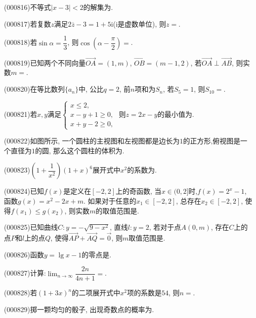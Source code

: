 \item (000816)不等式$|x-3|<2$的解集为.
\item (000817)若复数$z$满足$2 \overline z-3=1+5 \mathrm{i}$($\mathrm{i}$是虚数单位), 则$z=$.
\item (000818)若$\sin\alpha =\dfrac13$, 则$\cos(\alpha -\dfrac{\pi}2)=$.
\item (000819)已知两个不同向量$\overrightarrow{OA}=(1,m)$, $\overrightarrow{OB}=(m-1,2)$, 若$\overrightarrow{OA}\perp \overrightarrow{AB}$, 则实数$m=$.
\item (000820)在等比数列$\{a_n\}$中, 公比$q=2$, 前$n$项和为$S_n$, 若$S_5=1$, 则$S_{10}=$.
\item (000821)若$x,y$满足$\begin{cases}x\le 2, \\ x-y+1\ge 0, \\ x+y-2\ge 0,\end{cases}$ 则$z=2x-y$的最小值为.
\item (000822)如图所示, 一个圆柱的主视图和左视图都是边长为$1$的正方形,俯视图是一个直径为$1$的圆, 那么这个圆柱的体积为.
\begin{center}
\end{center}
\item (000823)$(1+\dfrac1{x^2})(1+x)^6$展开式中$x^2$的系数为.
\item (000824)已知$f(x)$是定义在$[-2,2]$上的奇函数, 当$x\in (0,2]$时,$f(x)=2^x-1$, 函数$g(x)=x^2-2x+m$. 如果对于任意的$x_1\in [-2,2]$, 总存在$x_2\in [-2,2]$, 使得$f(x_1)\le g(x_2)$, 则实数$m$的取值范围是.
\item (000825)已知曲线$C:y=-\sqrt{9-x^2}$, 直线$l:y=2$, 若对于点$A(0,m)$, 存在$C$上的点$P$和$l$上的点$Q$, 使得$\overrightarrow{AP}+\overrightarrow{AQ}=\overrightarrow 0$, 则$m$取值范围是.
\item (000826)函数$y=\lg x-1$的零点是.
\item (000827)计算:$\displaystyle\lim_{n\to\infty}\dfrac{2n}{4n+1}=$.
\item (000828)若$(1+3x)^n$的二项展开式中$x^2$项的系数是$54$, 则$n=$.
\item (000829)掷一颗均匀的骰子, 出现奇数点的概率为.
